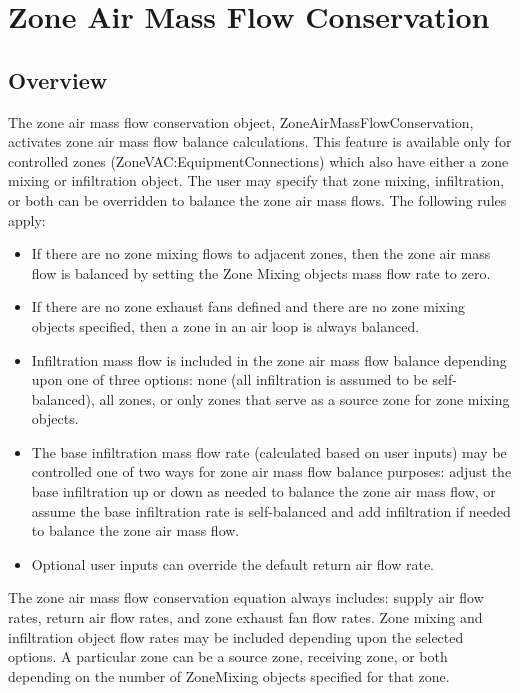 \section{Zone Air Mass Flow Conservation}\label{zone-air-mass-flow-conservation}

\subsection{Overview}\label{overiew}

The zone air mass flow conservation object, ZoneAirMassFlowConservation, activates zone air mass flow balance calculations. This feature is available only for controlled zones (ZoneVAC:EquipmentConnections) which also have either a zone mixing or infiltration object. The user may specify that zone mixing, infiltration, or both can be overridden to balance the zone air mass flows. The following rules apply:

\begin{itemize}
\tightlist
\item
  If there are no zone mixing flows to adjacent zones, then the zone air mass flow is balanced by setting the Zone Mixing objects mass flow rate to zero.
\item
  If there are no zone exhaust fans defined and there are no zone mixing objects specified, then a zone in an air loop is always balanced.
\item
  Infiltration mass flow is included in the zone air mass flow balance depending upon one of three options: none (all infiltration is assumed to be self-balanced), all zones, or only zones that serve as a source zone for zone mixing objects.
\item
  The base infiltration mass flow rate (calculated based on user inputs) may be controlled one of two ways for zone air mass flow balance purposes: adjust the base infiltration up or down as needed to balance the zone air mass flow, or assume the base infiltration rate is self-balanced and add infiltration if needed to balance the zone air mass flow.
\item
  Optional user inputs can override the default return air flow rate.
\end{itemize}

The zone air mass flow conservation equation always includes: supply air flow rates, return air flow rates, and zone exhaust fan flow rates. Zone mixing and infiltration object flow rates may be included depending upon the selected options. A particular zone can be a source zone, receiving zone, or both depending on the number of ZoneMixing objects specified for that zone.

